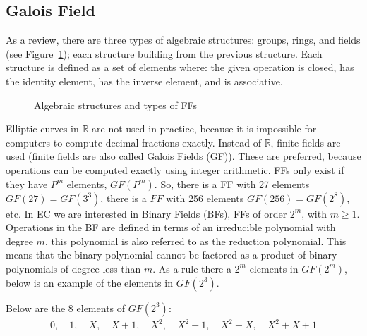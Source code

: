 \subsection{Galois Field} 
As a review, there are three types of algebraic structures: groups, rings, and fields (see Figure~\ref{fig:DH:DHKE_3}); each structure building from the previous structure.  Each structure is defined as a set of elements where: the given operation is closed, has the identity element, has the inverse element, and is associative.
\begin{figure}[H]
	  \caption{\label{fig:DH:DHKE_3} Algebraic structures and types of FFs }
\end{figure}
Elliptic curves in $\mathbb{R}$ are not used in practice, because it is impossible for computers to compute decimal fractions exactly.  Instead of $\mathbb{R}$, finite fields are used (finite fields are also called Galois Fields (GF)).  These are preferred, because operations can be computed exactly using integer arithmetic. FFs only exist if they have $P^m$ elements, $GF(P^m)$. So, there is a FF with 27 elements $GF(27) = GF(3^3)$, there is a $FF$ with 256 elements $GF(256) = GF(2^8)$, etc.  In EC we are interested in Binary Fields (BFs), FFs of order $2^m$, with $m ≥ 1$.  Operations in the BF are defined in terms of an irreducible polynomial with degree $m$, this polynomial is also referred to as the reduction polynomial.  This means that the binary polynomial cannot be factored as a product of binary polynomials of degree less than $m$.  As a rule there a $2^m$ elements in $GF(2^m)$, below is an example of the elements in $GF(2^3)$.  
\newline \newline
\begin{eg} Below are the 8 elements of $GF(2^3)$:
\begin{align*}
0, \quad 1, \quad X, \quad X +1, \quad X^2, \quad X^2+1, \quad X^2 + X, \quad X^2 + X + 1
 \end{align*}
\end{eg}
